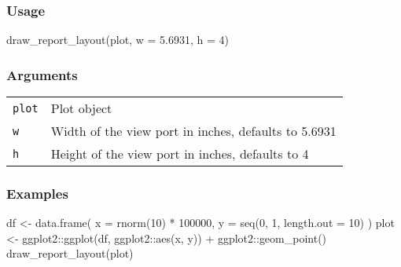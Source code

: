 \documentclass[
  letterpaper,
  DIV=11,
  numbers=noendperiod]{scrreport}
\newenvironment{Shaded}{\begin{snugshade}}{\end{snugshade}}
\newcommand{\AttributeTok}[1]{\textcolor[rgb]{0.40,0.45,0.13}{#1}}
\newcommand{\DecValTok}[1]{\textcolor[rgb]{0.68,0.00,0.00}{#1}}
\newcommand{\FloatTok}[1]{\textcolor[rgb]{0.68,0.00,0.00}{#1}}
\newcommand{\FunctionTok}[1]{\textcolor[rgb]{0.28,0.35,0.67}{#1}}
\newcommand{\NormalTok}[1]{\textcolor[rgb]{0.00,0.23,0.31}{#1}}
\newcommand{\OtherTok}[1]{\textcolor[rgb]{0.00,0.23,0.31}{#1}}
\newcommand{\SpecialCharTok}[1]{\textcolor[rgb]{0.37,0.37,0.37}{#1}}
\begin{document}
\subsubsection{Usage}\label{usage-78}

\begin{Shaded}
\begin{Highlighting}[]
\FunctionTok{draw\_report\_layout}\NormalTok{(plot, }\AttributeTok{w =} \FloatTok{5.6931}\NormalTok{, }\AttributeTok{h =} \DecValTok{4}\NormalTok{)}
\end{Highlighting}
\end{Shaded}

\subsubsection{Arguments}\label{arguments-78}

\begin{longtable}[]{@{}ll@{}}
\toprule\noalign{}
\endhead
\bottomrule\noalign{}
\endlastfoot
\texttt{plot} & Plot object \\
\texttt{w} & Width of the view port in inches, defaults to 5.6931 \\
\texttt{h} & Height of the view port in inches, defaults to 4 \\
\end{longtable}

\subsubsection{Examples}\label{examples-77}

\begin{Shaded}
\begin{Highlighting}[]
\NormalTok{df }\OtherTok{\textless{}{-}} \FunctionTok{data.frame}\NormalTok{(}
  \AttributeTok{x =} \FunctionTok{rnorm}\NormalTok{(}\DecValTok{10}\NormalTok{) }\SpecialCharTok{*} \DecValTok{100000}\NormalTok{,}
  \AttributeTok{y =} \FunctionTok{seq}\NormalTok{(}\DecValTok{0}\NormalTok{, }\DecValTok{1}\NormalTok{, }\AttributeTok{length.out =} \DecValTok{10}\NormalTok{)}
\NormalTok{)}
\NormalTok{plot }\OtherTok{\textless{}{-}}\NormalTok{ ggplot2}\SpecialCharTok{::}\FunctionTok{ggplot}\NormalTok{(df, ggplot2}\SpecialCharTok{::}\FunctionTok{aes}\NormalTok{(x, y)) }\SpecialCharTok{+}\NormalTok{ ggplot2}\SpecialCharTok{::}\FunctionTok{geom\_point}\NormalTok{()}
\FunctionTok{draw\_report\_layout}\NormalTok{(plot)}
\end{Highlighting}
\end{Shaded}
\end{document}
